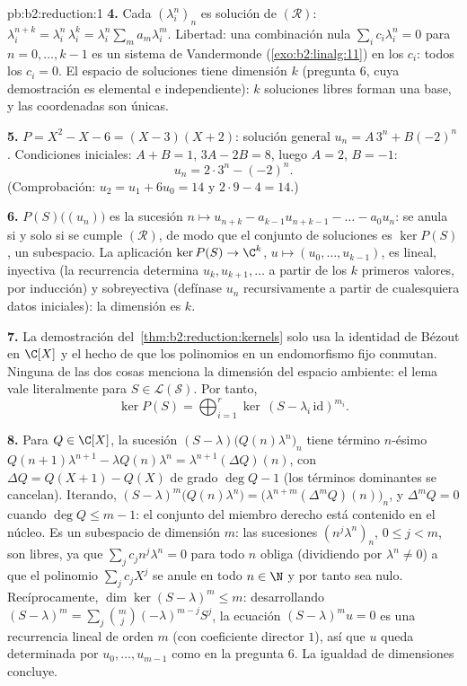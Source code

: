 \begin{solution}{pb:b2:reduction:1}
\textbf{4.} Cada $(\lambda_i^n)_n$ es solución de $(\mathcal R)$:
$\lambda_i^{n+k} = \lambda_i^n\,\lambda_i^k = \lambda_i^n\sum_m
a_m\lambda_i^m$. Libertad: una combinación nula $\sum_i
c_i\lambda_i^n = 0$ para $n = 0, \dots, k-1$ es un sistema de
Vandermonde (\cref{exo:b2:linalg:11}) en los $c_i$: todos los $c_i
= 0$. El espacio de soluciones tiene dimensión $k$ (pregunta 6,
cuya demostración es elemental e independiente): $k$ soluciones
libres forman una base, y las coordenadas son únicas.

\textbf{5.} $P = X^2 - X - 6 = (X - 3)(X + 2)$: solución general
$u_n = A\,3^n + B(-2)^n$. Condiciones iniciales: $A + B = 1$, $3A -
2B = 8$, luego $A = 2$, $B = -1$:
\[
u_n = 2\cdot 3^n - (-2)^n .
\]
(Comprobación: $u_2 = u_1 + 6u_0 = 14$ y $2\cdot9 - 4 = 14$.)

\textbf{6.} $P(S)\bigl((u_n)\bigr)$ es la sucesión $n \mapsto
u_{n+k} - a_{k-1}u_{n+k-1} - \dots - a_0u_n$: se anula si y solo si
se cumple $(\mathcal R)$, de modo que el conjunto de soluciones es
$\ker P(S)$, un subespacio. La aplicación $\ker P(S) \to \C^k$, $u
\mapsto (u_0, \dots, u_{k-1})$, es lineal, inyectiva (la
recurrencia determina $u_{k}, u_{k+1}, \dots$ a partir de los $k$
primeros valores, por inducción) y sobreyectiva (defínase $u_n$
recursivamente a partir de cualesquiera datos iniciales): la
dimensión es $k$.

\textbf{7.} La demostración del~\cref{thm:b2:reduction:kernels}
solo usa la identidad de Bézout en $\C[X]$ y el hecho de que los
polinomios en un endomorfismo fijo conmutan. Ninguna de las dos
cosas menciona la dimensión del espacio ambiente: el lema vale
literalmente para $S \in \mathcal{L}(\mathcal{S})$. Por tanto,
\[
\ker P(S) = \bigoplus_{i=1}^{r}
\ker\,(S - \lambda_i\,\mathrm{id})^{m_i}.
\]

\textbf{8.} Para $Q \in \C[X]$, la sucesión $(S -
\lambda)\bigl(Q(n)\lambda^n\bigr)_n$ tiene término $n$-ésimo
$Q(n{+}1)\lambda^{n+1} - \lambda Q(n)\lambda^n =
\lambda^{n+1}(\Delta Q)(n)$, con $\Delta Q = Q(X{+}1) - Q(X)$ de
grado $\deg Q - 1$ (los términos dominantes se cancelan).
Iterando, $(S - \lambda)^m\bigl(Q(n)\lambda^n\bigr) =
\bigl(\lambda^{n+m}(\Delta^m Q)(n)\bigr)_n$, y $\Delta^m Q = 0$
cuando $\deg Q \leq m - 1$: el conjunto del miembro derecho está
contenido en el núcleo. Es un subespacio de dimensión $m$: las
sucesiones $(n^j\lambda^n)_n$, $0 \leq j < m$, son libres, ya que
$\sum_j c_j n^j\lambda^n = 0$ para todo $n$ obliga (dividiendo por
$\lambda^n \neq 0$) a que el polinomio $\sum_j c_jX^j$ se anule en
todo $n \in \N$ y por tanto sea nulo. Recíprocamente, $\dim\ker(S
- \lambda)^m \leq m$: desarrollando $(S - \lambda)^m = \sum_j
\binom mj(-\lambda)^{m-j}S^j$, la ecuación $(S - \lambda)^m u = 0$
es una recurrencia lineal de orden $m$ (con coeficiente director
$1$), así que $u$ queda determinada por $u_0, \dots, u_{m-1}$ como
en la pregunta 6. La igualdad de dimensiones concluye.


\end{solution}
